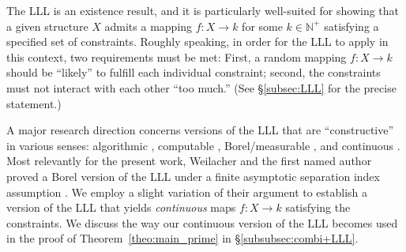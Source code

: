 \documentclass[11pt,reqno,psamsfonts]{amsart}
\theoremstyle{bfnote}
\theoremstyle{definition}
\theoremstyle{remark}
\newcommand{\0}{\varnothing}
\newcommand{\N}{\mathbb{N}}
\numberwithin{equation}{section}
\begin{document}
    The LLL is an existence result, and it is particularly well-suited for showing that a given structure $X$ admits a mapping $f \colon X \to k$ for some $k \in \N^+$ satisfying a specified set of constraints. Roughly speaking, in order for the LLL to apply in this context, two requirements must be met: First, a random mapping $f \colon X \to k$ should be ``likely'' to fulfill each individual constraint; second, the constraints must not interact with each other ``too much.'' (See \S\ref{subsec:LLL} for the precise statement.)


    A major research direction concerns 
    versions of the LLL that are ``constructive'' in various senses: algorithmic \cite{Beck,BGRDeterministicLLL,BMUDeterministicLLL,FG,MoserTardos}, computable \cite{RSh}, Borel/measurable \cite{CGMPT,BerDist,BerMeas,BerYuBorelLLL}, and continuous \cite{BerDist,Ber_cont}. %
    Most relevantly for the present work, Weilacher and the first named author proved a {Borel} version of the LLL under a finite asymptotic separation index assumption \cite{BW}. We employ a slight variation of their argument to establish a version of the LLL that yields \emph{continuous} maps $f \colon X \to k$ satisfying the constraints. %
    We discuss %
    the way our continuous version of the LLL becomes used in the proof of Theorem~\ref{theo:main_prime} in \S\ref{subsubsec:combi+LLL}.


\end{document}
